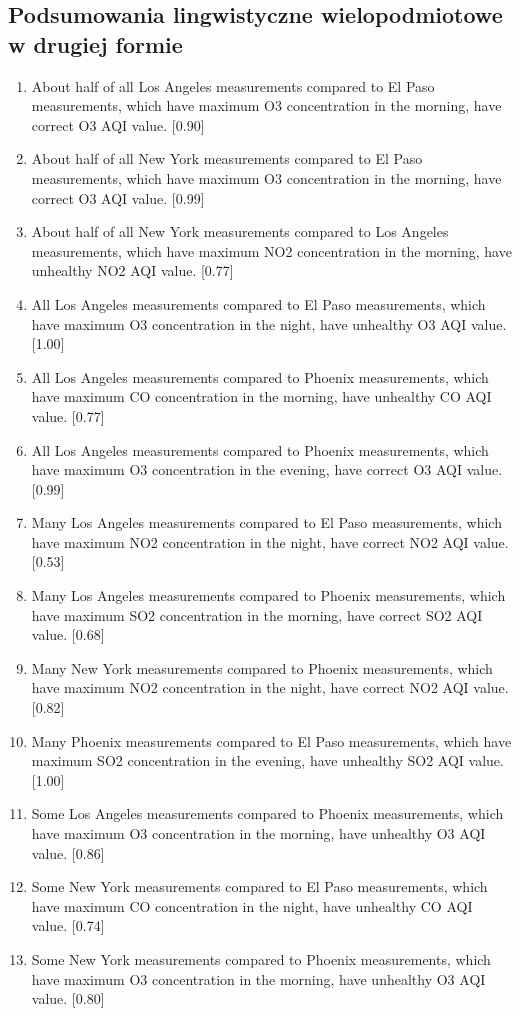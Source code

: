 \documentclass{classrep}
\begin{document}
{        \subsection{Podsumowania lingwistyczne wielopodmiotowe w drugiej formie} {
            \begin{enumerate}
                \item About half of all Los Angeles measurements compared to El Paso measurements, which have maximum O3 concentration in the morning, have correct O3 AQI value. [0.90]
                \item About half of all New York measurements compared to El Paso measurements, which have maximum O3 concentration in the morning, have correct O3 AQI value. [0.99]
                \item About half of all New York measurements compared to Los Angeles measurements, which have maximum NO2 concentration in the morning, have unhealthy NO2 AQI value. [0.77]
                \item All Los Angeles measurements compared to El Paso measurements, which have maximum O3 concentration in the night, have unhealthy O3 AQI value. [1.00]
                \item All Los Angeles measurements compared to Phoenix measurements, which have maximum CO concentration in the morning, have unhealthy CO AQI value. [0.77]
                \item All Los Angeles measurements compared to Phoenix measurements, which have maximum O3 concentration in the evening, have correct O3 AQI value. [0.99]
                \item Many Los Angeles measurements compared to El Paso measurements, which have maximum NO2 concentration in the night, have correct NO2 AQI value. [0.53]
                \item Many Los Angeles measurements compared to Phoenix measurements, which have maximum SO2 concentration in the morning, have correct SO2 AQI value. [0.68]
                \item Many New York measurements compared to Phoenix measurements, which have maximum NO2 concentration in the night, have correct NO2 AQI value. [0.82]
                \item Many Phoenix measurements compared to El Paso measurements, which have maximum SO2 concentration in the evening, have unhealthy SO2 AQI value. [1.00]
                \item Some Los Angeles measurements compared to Phoenix measurements, which have maximum O3 concentration in the morning, have unhealthy O3 AQI value. [0.86]
                \item Some New York measurements compared to El Paso measurements, which have maximum CO concentration in the night, have unhealthy CO AQI value. [0.74]
                \item Some New York measurements compared to Phoenix measurements, which have maximum O3 concentration in the morning, have unhealthy O3 AQI value. [0.80]
            \end{enumerate}
        }

}
\end{document}
